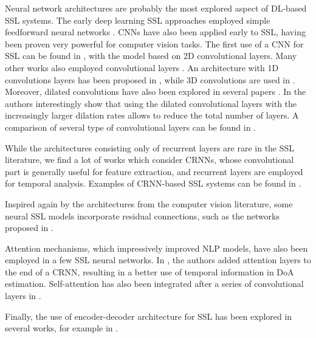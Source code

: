 Neural network architectures are probably the most explored aspect of DL-based SSL systems.  The early deep learning SSL approaches employed simple feedforward neural networks 
\cite{kim_direction_2011,youssef_learning-based_2013,xiao_learning-based_2015,vesperini_neural_2016,roden_sound_2015}.
CNNs have also been applied early to SSL, having been proven very powerful for computer vision tasks. The first use of a CNN for SSL can be found in \cite{hirvonen_classication_2015}, with the model based on 2D convolutional layers. Many other works also employed convolutional layers \cite{chakrabarty_multi-speaker_2017, chakrabarty_multi-speaker_2019, he_joint_2018, vera-diaz_towards_2018}. An architecture with 1D convolutions layers has been proposed in \cite{bologni_acoustic_2021}, while 3D convolutions are used in \cite{diaz-guerra_robust_2021}. Moreover, dilated convolutions have also been explored in several papers \cite{chakrabarty_multi-speaker_2019,pujol_beamlearning_2021,guirguis_seld-tcn_2021}. In \cite{chakrabarty_multi-speaker_2019} the authors interestingly show that using the dilated convolutional layers with the increasingly larger dilation rates allows to reduce the total number of layers. A comparison of several type of convolutional layers can be found in \cite{krause_comparison_2021}.

While the architectures consisting only of recurrent layers are rare in the SSL literature, we find a lot of works which consider CRNNs, whose convolutional part is generally useful for feature extraction, and recurrent layers are employed for temporal analysis. Examples of CRNN-based SSL systems can be found in \cite{adavanne_localization_2019,perotin_crnn-based_2018,perotin_crnn-based_2019,maruri_gcc-phat_2019,comminiello_quaternion_2019}.

Inspired again by the architectures from the computer vision literature, some neural SSL models incorporate residual connections, such as the networks proposed in  \cite{yalta_sound_2017,suvorov_deep_2018}.

Attention mechanisms, which impressively improved NLP models, have also been employed in a few SSL neural networks. In \cite{schymura_exploiting_2021, phan_multitask_2020}, the authors added attention layers to the end of a CRNN, resulting in a better use of temporal information in DoA estimation. Self-attention has also been integrated after a series of convolutional layers in \cite{cao_improved_2021, schymura_pilot_2021, wang_four-stage_2021}.

Finally, the use of encoder-decoder architecture for SSL has been explored in several works, for example in \cite{huang_time-domain_2020, moing_learning_2020, wu_sslide_2021}.

